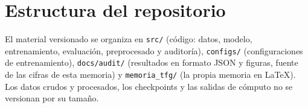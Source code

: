 \section{Estructura del repositorio}

El material versionado se organiza en \texttt{src/} (código: datos, modelo,
entrenamiento, evaluación, preprocesado y auditoría), \texttt{configs/}
(configuraciones de entrenamiento), \texttt{docs/audit/} (resultados en formato
JSON y figuras, fuente de las cifras de esta memoria) y \texttt{memoria\_tfg/}
(la propia memoria en \LaTeX). Los datos crudos y procesados, los checkpoints y
las salidas de cómputo no se versionan por su tamaño.
